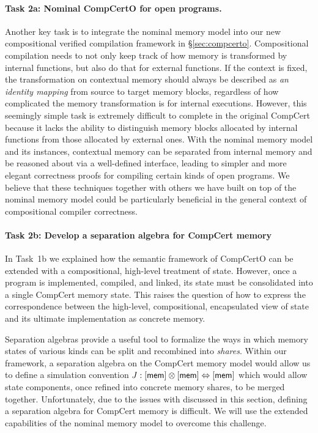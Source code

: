 \paragraph*{Task 2a: Nominal CompCertO for open programs.}
Another key task is to integrate the nominal memory model into our
new compositional verified compilation framework in
\S\ref{sec:compcerto}.  Compositional compilation needs to not only
keep track of how memory is transformed by internal functions, but
also do that for external functions.  If the context is fixed, the
transformation on contextual memory should always be described as
\emph{an identity mapping} from source to target memory blocks,
regardless of how complicated the memory transformation is for
internal executions.  However, this seemingly simple task is extremely
difficult to complete in the original CompCert because it lacks the
ability to distinguish memory blocks allocated by internal functions
from those allocated by external ones. With the nominal memory model and its
instances, contextual memory can be separated from internal memory and
be reasoned about via a well-defined interface, leading to simpler and
more elegant correctness proofs for compiling certain kinds of open
programs. We believe that these techniques together with others we
have built on top of the nominal memory model could be particularly
beneficial in the general context of compositional compiler
correctness.

\vspace*{-2ex}
\paragraph*{Task 2b: Develop a separation algebra for CompCert memory}
In Task~1b we explained how the semantic framework of CompCertO
can be extended with a compositional, high-level treatment of state.
However, once a program is implemented, compiled, and linked,
its state must be consolidated into
a single CompCert memory state.
This raises the question of how to express
the correspondence between
the high-level, compositional, encapsulated view of state
and its ultimate implementation as concrete memory.

Separation algebras \cite{sepalg}
provide a useful tool to formalize the ways in which
memory states of various kinds can be
split and recombined into \emph{shares}.
Within our framework,
a separation algebra on the CompCert memory model
would allow us to define
a simulation convention
$J : [ \mathsf{mem} ] \otimes [ \mathsf{mem} ] \Leftrightarrow [ \mathsf{mem} ]$
which would allow state components,
once refined into concrete memory shares,
to be merged together.
%
Unfortunately,
due to the issues with \nextblock
discussed in this section,
defining a separation algebra for CompCert memory
is difficult.
We will use the extended capabilities of
the nominal memory model
to overcome this challenge.

